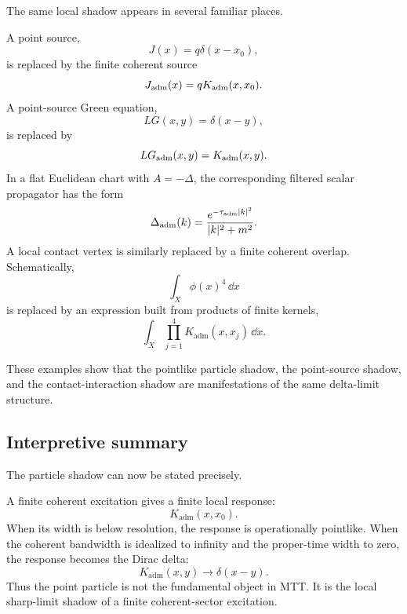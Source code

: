 \documentclass[11pt]{article}
\newcommand{\Kadm}{K_{\mathrm{adm}}}
\newcommand{\ta}{\tau_{\mathrm{adm}}}
\begin{document}
The same local shadow appears in several familiar places.

A point source,
\begin{equation}
  J(x)=q\delta(x-x_0),
\end{equation}
is replaced by the finite coherent source
\begin{equation}
  J_{\rm adm}(x)
  =
  q\Kadm(x,x_0).
\end{equation}
A point-source Green equation,
\begin{equation}
  LG(x,y)=\delta(x-y),
\end{equation}
is replaced by
\begin{equation}
  LG_{\rm adm}(x,y)=\Kadm(x,y).
\end{equation}
In a flat Euclidean chart with \(A=-\Delta\), the corresponding filtered scalar propagator has
the form
\begin{equation}
  \Delta_{\rm adm}(k)
  =
  \frac{e^{-\ta |k|^2}}{|k|^2+m^2}.
  \label{eq:filtered-propagator-particle-section}
\end{equation}
A local contact vertex is similarly replaced by a finite coherent overlap. Schematically,
\begin{equation}
  \int_X \phi(x)^4\,\dd x
\end{equation}
is replaced by an expression built from products of finite kernels,
\begin{equation}
  \int_X
  \prod_{j=1}^4 \Kadm(x,x_j)
  \,\dd x.
\end{equation}

These examples show that the pointlike particle shadow, the point-source shadow, and the
contact-interaction shadow are manifestations of the same delta-limit structure.

\subsection{Interpretive summary}
\label{subsec:particle-summary}

The particle shadow can now be stated precisely.

A finite coherent excitation gives a finite local response:
\begin{equation}
  \Kadm(x,x_0).
\end{equation}
When its width is below resolution, the response is operationally pointlike. When the coherent
bandwidth is idealized to infinity and the proper-time width to zero, the response becomes
the Dirac delta:
\begin{equation}
  \Kadm(x,y)\to\delta(x-y).
\end{equation}
Thus the point particle is not the fundamental object in MTT. It is the local sharp-limit
shadow of a finite coherent-sector excitation.
\end{document}
